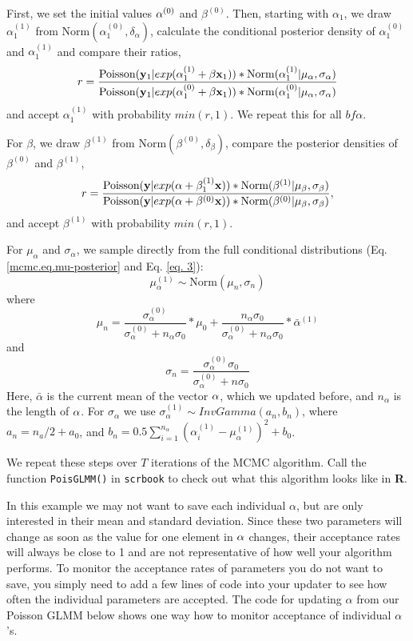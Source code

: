 First, we set the initial values ${\bf \alpha}^{(0)}$ and $\beta^{(0)}$. Then, starting with $\alpha_1$, we draw $\alpha_1^{(1)}$ from $\mbox{Norm}(\alpha_1^{(0)}, \delta_{\alpha})$, calculate the conditional posterior density of $\alpha_1^{(0)}$ and $\alpha_1^{(1)}$  and compare their ratios,
\[
r = \frac{\mbox{Poisson}({\bf y}_{1}|exp(\alpha_1^{(1)} + \beta {\bf x}_1)) *
  \mbox{Norm}(\alpha_1^{(1)}|\mu_{\alpha}, \sigma_{\alpha})} {\mbox{Poisson}({\bf y}_{1}|exp(\alpha_1^{(0)} + \beta {\bf x}_1)) * \mbox{Norm}(\alpha_1^{(0)}|\mu_{\alpha}, \sigma_{\alpha})}
\]
and accept $\alpha_1^{(1)}$ with probability $min(r,1)$. We repeat this for all ${bf \alpha}$.

For $\beta$, we draw $\beta^{(1)}$ from $\mbox{Norm} (\beta^{(0)}, \delta_{\beta})$, compare the posterior densities of $\beta^{(0)}$ and $\beta^{(1)}$,
\[
r = \frac{\mbox{Poisson}({\bf y}|exp({\bf \alpha} + \beta_1^{(1)}{\bf x}))
  *\mbox{Norm}(\beta^{(1)}|\mu_{\beta}, \sigma_{\beta})} { \mbox{Poisson}({\bf
    y}|exp({\bf \alpha} + \beta^{(0)}{\bf x})) *\mbox{Norm}(\beta^{(0)}|\mu_{\beta}, \sigma_{\beta})},
\]
and accept $\beta^{(1)}$  with probability $min(r,1)$.

For $\mu_{\alpha}$ and $\sigma_{\alpha}$, we sample directly from the full conditional distributions (Eq. \ref{mcmc.eq.mu-posterior}  and Eq. \ref{eq. 3}):
\[
\mu_{\alpha}^{(1)} \sim \mbox{Norm} (\mu_n, \sigma_n)
\]
where 
\[\mu_n =  \frac{\sigma_{\alpha}^{(0)}}  {\sigma_{\alpha}^{(0)}   +n_{\alpha}    \sigma_0} *  \mu_0 +  \frac{n_{\alpha}  \sigma_0} {\sigma_{\alpha}^{(0)}   +n_{\alpha} \sigma_0} *\bar{\alpha}^{(1)}
\]
and 
\[
\sigma_n= \frac{\sigma_{\alpha}^{(0)}   \sigma_0 } {\sigma_{\alpha}^{(0)}  + n \sigma_0}
\]
Here, $\bar{\alpha}$ is the current mean of the vector ${\bf\alpha}$, which we
updated before, and $n_{\alpha}$ is the length of ${\bf\alpha}$. 
For $\sigma_{\alpha}$ we use $\sigma_{\alpha}^{(1)}\sim InvGamma (a_n, b_n)$,
where  $a_n = n_a/2   + a_0$, and $b_n = 0.5  \displaystyle\sum\limits_{i=1}^{n_{\alpha}} (\alpha_i^{(1)}-\mu_{\alpha}^{(1)})^2+ b_0$.


We repeat these steps over $T$ iterations of the MCMC algorithm. Call the function \mbox{\tt PoisGLMM()}  in \mbox{\tt scrbook}  to check out what this algorithm looks like in {\bf R}.

In this example we may not want to save each individual $\alpha$, but are only interested in their mean and standard deviation. Since these two parameters will change as soon as the value for one element in $\bf{\alpha}$ changes, their acceptance rates will always be close to 1 and are not representative of how well your algorithm performs. To monitor the acceptance rates of parameters you do not want to save, you simply need to add a few lines of code into your updater to see how often the individual parameters are accepted. The code for updating $\alpha$ from our Poisson GLMM below shows one way how to monitor acceptance of individual $\alpha$'s.

